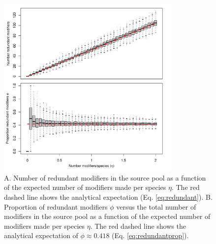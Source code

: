 \documentclass[twocolumn,preprintnumbers,amsmath,amssymb,superscriptaddress]{revtex4}
\begin{document}
\begin{figure}[h!]
\centering
\includegraphics[width=0.8\textwidth]{fig_redundancy.pdf}
\caption{
A. Number of redundant modifiers in the source pool as a function of the expected number of modifiers made per species $\eta$.
The red dashed line shows the analytical expectation (Eq. \ref{eq:redundant}).
B. Proportion of redundant modifiers $\phi$ versus the total number of modifiers in the source pool as a function of the expected number of modifiers made per species $\eta$.
The red dashed line shows the analytical expectation of $\phi \approx 0.418$ (Eq. \ref{eq:redundantprop}).
}
\label{fig:redundancy}
\end{figure}
\end{document}

